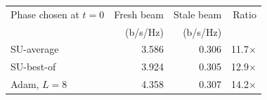 \begin{tabular}{lrrr}
\toprule
Phase chosen at $t=0$ & Fresh beam & Stale beam & Ratio \\
 & (b/s/Hz) & (b/s/Hz) & \\
\midrule
SU-average & 3.586 & 0.306 & 11.7$\times$ \\
SU-best-of & 3.924 & 0.305 & 12.9$\times$ \\
Adam, $L=8$ & 4.358 & 0.307 & 14.2$\times$ \\
\bottomrule
\end{tabular}
